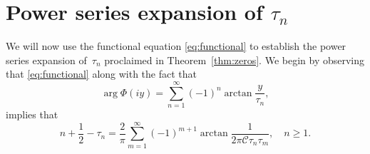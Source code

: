 \documentclass[12pt]{amsart}
\theoremstyle{plain}
\numberwithin{equation}{section}
\theoremstyle{definition}
\newcommand{\Cone}{\mathscr{C}}
\begin{document}
\section{Power series expansion of \texorpdfstring{$\tau_n$}{tau}}
\label{sec:taun}
We will now use the functional equation \eqref{eq:functional} to establish the power series expansion of~$\tau_n$ proclaimed in Theorem~\ref{thm:zeros}.
We begin by observing that \eqref{eq:functional} along with the fact that
	\[ \arg \Phi(iy)=\sum_{n=1}^\infty (-1)^n \arctan \frac{y}{\tau_n}, \]
	implies that
\begin{equation} \label{eq:zeros} n+\frac12-\tau_n=\frac{2}{\pi} \sum_{m=1}^\infty
(-1)^{m+1} \arctan \frac{1}{2\pi \Cone \tau_n \tau_m}, \quad n\ge 1 . \end{equation}
\end{document}
